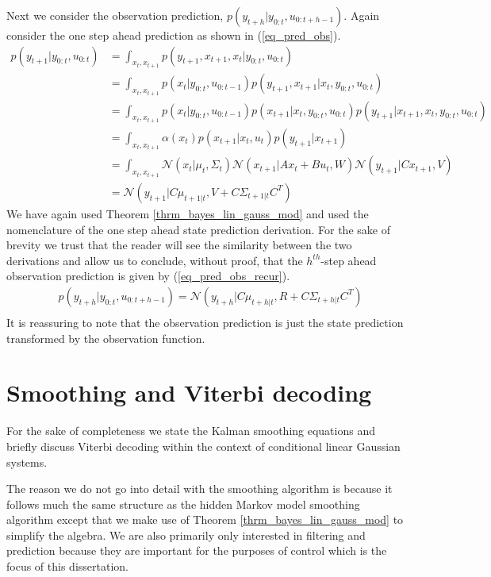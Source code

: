 Next we consider the observation prediction, $p(y_{t+h}|y_{0:t}, u_{0:t+h-1})$. Again consider the one step ahead prediction as shown in (\ref{eq_pred_obs}).
\begin{equation}
\begin{aligned}
p(y_{t+1}|y_{0:t}, u_{0:t}) &= \int_{x_t, x_{t+1}} p(y_{t+1},x_{t+1},x_t|y_{0:t}, u_{0:t}) \\
&= \int_{x_t, x_{t+1}} p(x_t|y_{0:t}, u_{0:t-1})p(y_{t+1},x_{t+1}|x_t, y_{0:t}, u_{0:t}) \\
&= \int_{x_t, x_{t+1}} p(x_t|y_{0:t}, u_{0:t-1}) p(x_{t+1}|x_t, y_{0:t}, u_{0:t})p(y_{t+1}|x_{t+1}, x_t, y_{0:t}, u_{0:t}) \\
&= \int_{x_t, x_{t+1}} \alpha(x_t) p(x_{t+1}|x_t, u_{t}) p(y_{t+1}|x_{t+1}) \\
&= \int_{x_t, x_{t+1}} \mathcal{N}(x_t|\mu_t,\Sigma_t) \mathcal{N}(x_{t+1}|Ax_t+Bu_t, W) \mathcal{N}(y_{t+1}|Cx_{t+1}, V) \\
&= \mathcal{N}(y_{t+1}|C\mu_{t+1|t}, V+C\Sigma_{t+1|t}C^T)
\end{aligned}
\label{eq_pred_obs}
\end{equation}
We have again used Theorem \ref{thrm_bayes_lin_gauss_mod} and used the nomenclature of the one step ahead state prediction derivation. For the sake of brevity we trust that the reader will see the similarity between the two derivations and allow us to conclude, without proof, that the $h^{th}$-step ahead observation prediction is given by (\ref{eq_pred_obs_recur}).
\begin{equation}
\begin{aligned}
&p(y_{t+h}|y_{0:t}, u_{0:t+h-1}) = \mathcal{N}(y_{t+h}|C\mu_{t+h|t}, R+C\Sigma_{t+h|t}C^T) \\
\end{aligned}
\label{eq_pred_obs_recur}
\end{equation}
It is reassuring to note that the observation prediction is just the state prediction transformed by the observation function.

\section{Smoothing and Viterbi decoding}
For the sake of completeness we state the Kalman smoothing equations and briefly discuss Viterbi decoding within the context of conditional linear Gaussian systems. 

The reason we do not go into detail with the smoothing algorithm is because it follows much the same structure as the hidden Markov model smoothing algorithm except that we make use of Theorem \ref{thrm_bayes_lin_gauss_mod} to simplify the algebra. We are also primarily only interested in filtering and prediction because they are important for the purposes of control which is the focus of this dissertation.

